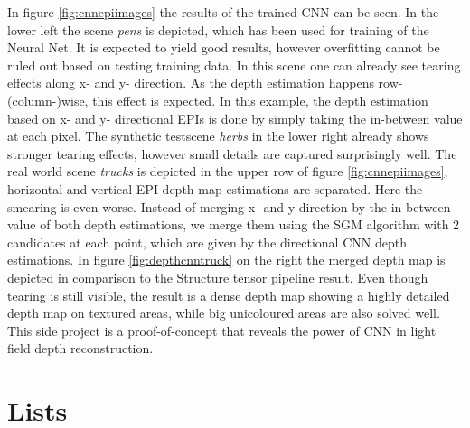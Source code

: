 \documentclass  [
  paper    = a4,
  BCOR     = 10mm,
  twoside,
  fontsize = 12pt,
  fleqn,
  toc      = bibnumbered,
  toc      = listofnumbered,
  numbers  = noendperiod,
  headings = normal,
  listof   = leveldown,
  version  = 3.03
]                                       {scrreprt}
\begin{document}
\begin{appendix}
In figure \ref{fig:cnnepiimages} the results of the trained CNN can be seen. In the lower left the scene \textit{pens} is depicted, which has been used for training of the Neural Net. It is expected to yield good results, however overfitting cannot be ruled out based on testing training data. In this scene one can already see tearing effects along x- and y- direction. As the depth estimation happens row-(column-)wise, this effect is expected. In this example, the depth estimation based on x- and y- directional EPIs is done by simply taking the in-between value at each pixel. The synthetic testscene \textit{herbs} in the lower right already shows stronger tearing effects, however small details are captured surprisingly well. The real world scene \textit{trucks} is depicted in the upper row of figure \ref{fig:cnnepiimages}, horizontal and vertical EPI depth map estimations are separated. Here the smearing is even worse. Instead of merging x- and y-direction by the in-between value of both depth estimations, we merge them using the SGM algorithm with 2 candidates at each point, which are given by the directional CNN depth estimations. In figure \ref{fig:depthcnntruck} on the right the merged depth map is depicted in comparison to the Structure tensor pipeline result. Even though tearing is still visible, the result is a dense depth map showing a highly detailed depth map on textured areas, while big unicoloured areas are also solved well.\\
This side project is a proof-of-concept that reveals the power of CNN in light field depth reconstruction.
%

\end{appendix}
\chapter{Lists}
\listoffigures
\listoftables
{}


    
\end{document}

